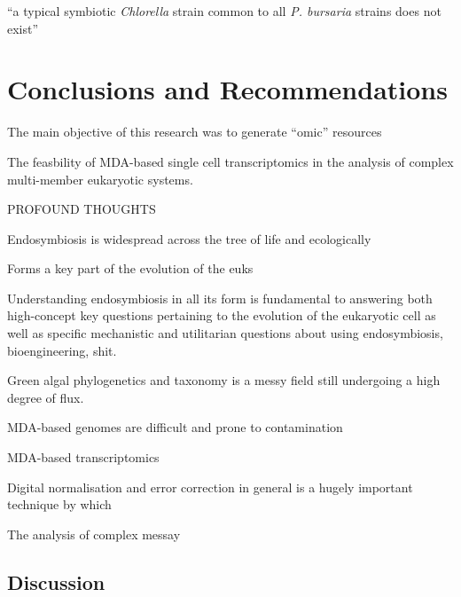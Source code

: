 \graphicspath{{chapters/7.Discussion/figures}}

\begin{savequote}[75mm]
    ``a typical symbiotic \textit{Chlorella} strain common to all \textit{P. bursaria}
    strains does not exist''
\end{savequote}

\chapter{Conclusions and Recommendations}

The main objective of this research was to generate ``omic'' resources


The feasbility of MDA-based single cell transcriptomics in the analysis
of complex multi-member eukaryotic systems.








PROFOUND THOUGHTS

Endosymbiosis 
is widespread across the tree of life and
ecologically

Forms a key part of the evolution of the euks


Understanding endosymbiosis in all its form is
fundamental to answering both high-concept key questions 
pertaining to the evolution
of the eukaryotic cell as well as specific mechanistic
and utilitarian questions about using
endosymbiosis, bioengineering, shit.


Green algal phylogenetics and taxonomy is a messy field still 
undergoing a high degree of flux. 

MDA-based genomes are difficult and prone to contamination 

MDA-based transcriptomics 


Digital normalisation and error correction in general is a hugely
important technique by which 




The analysis of complex messay 


\section{Discussion}

\sect

\section{}

